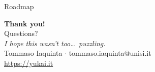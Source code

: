\documentclass[aspectratio=169, 12pt]{beamer}
\begin{document}
\begin{frame}{Roadmap}
  \tableofcontents[hideallsubsections]
\end{frame}








{
\begin{frame}[plain]
  \vfill
  \begin{center}
    {\fontsize{34}{40}\selectfont\color{white}\textbf{Thank you!}}\\[1em]
    {\large\color{white!80} Questions?}\\[0.6em]
    {\small\color{white!60}\textit{I hope this wasn't too\ldots\ puzzling.}}\\[2em]
    {\small\color{white!60} Tommaso Iaquinta $\cdot$ tommaso.iaquinta@unisi.it}\\[0.3em]
    {\small\color{white!60} \url{https://yukai.it}}
  \end{center}
  \vfill
\end{frame}
}
\end{document}
